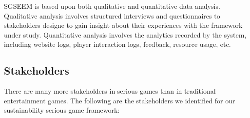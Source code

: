 \documentclass{sigchi}
\begin{document}

SGSEEM is based upon both qualitative and
quantitative data analysis. Qualitative analysis involves
structured interviews and questionnaires to stakeholders 
designe to gain insight about their experiences with the 
framework under study. Quantitative analysis involves the analytics
recorded by the system, including website logs, player interaction
logs, feedback, resource usage, etc.


\subsection{Stakeholders}


There are many more stakeholders in serious games than in traditional entertainment
games. The following are the stakeholders we identified for our sustainability serious game framework:
\end{document}
